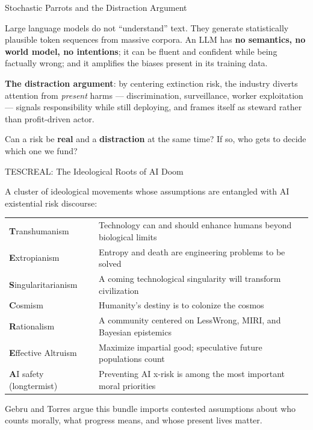 \documentclass[aspectratio=169,11pt]{beamer}
\begin{document}
\begin{frame}[shrink=8]{Stochastic Parrots and the Distraction Argument}
\begin{objectionbox}
Large language models do not ``understand'' text. They generate statistically plausible token sequences from massive corpora. An LLM has \textbf{no semantics, no world model, no intentions}; it can be fluent and confident while being factually wrong; and it amplifies the biases present in its training data.
\vspace{0.1cm}
\scriptsize\parencite{bender_stochastic_parrots_2021}
\end{objectionbox}

\textbf{The distraction argument}: by centering extinction risk, the industry diverts attention from \emph{present} harms --- discrimination, surveillance, worker exploitation --- signals responsibility while still deploying, and frames itself as steward rather than profit-driven actor.

\begin{discussionbox}[Discussion]
Can a risk be \textbf{real} and a \textbf{distraction} at the same time? If so, who gets to decide which one we fund?
\end{discussionbox}
\end{frame}

\begin{frame}{TESCREAL: The Ideological Roots of AI Doom}
\begin{conceptbox}
A cluster of ideological movements whose assumptions are entangled with AI existential risk discourse:
\vspace{0.1cm}

\scriptsize
\begin{tabular}{@{}p{2.8cm}p{8.7cm}@{}}
\toprule
\textbf{T}ranshumanism & Technology can and should enhance humans beyond biological limits \\
\textbf{E}xtropianism & Entropy and death are engineering problems to be solved \\
\textbf{S}ingularitarianism & A coming technological singularity will transform civilization \\
\textbf{C}osmism & Humanity's destiny is to colonize the cosmos \\
\textbf{R}ationalism & A community centered on LessWrong, MIRI, and Bayesian epistemics \\
\textbf{E}ffective Altruism & Maximize impartial good; speculative future populations count \\
\textbf{A}I safety (longtermist) & Preventing AI x-risk is among the most important moral priorities \\
\bottomrule
\end{tabular}
\vspace{0.1cm}

\parencite{gebru_torres_tescreal_2024}
\end{conceptbox}
Gebru and Torres argue this bundle imports contested assumptions about who counts morally, what progress means, and whose present lives matter.
\end{frame}
\end{document}
